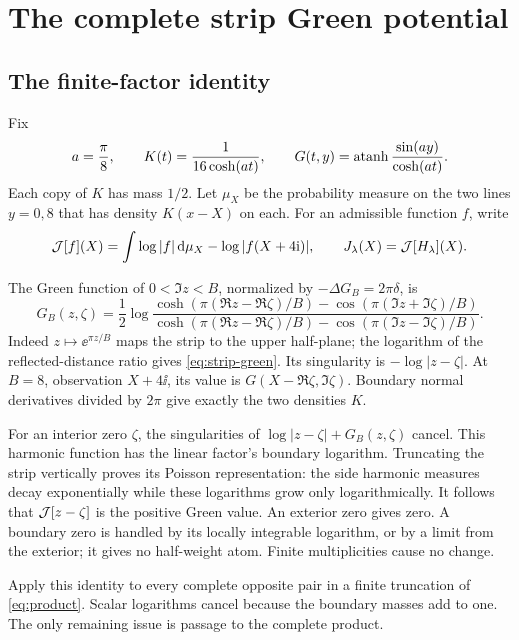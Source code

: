 \section{The complete strip Green potential}\label{sec:green}

\subsection{The finite-factor identity}

Fix
\begin{equation}\label{eq:kernels}
 a=\frac\pi8,\qquad K(t)=\frac1{16\cosh(at)},\qquad
 G(t,y)=\operatorname{atanh}\frac{\sin(ay)}{\cosh(at)}.
\end{equation}
Each copy of \(K\) has mass \(1/2\). Let \(\mu_X\) be the probability
measure on the two lines \(y=0,8\) that has density \(K(x-X)\) on
each. For an admissible function \(f\), write
\[
 \mathcal J[f](X)=\int\log|f|\,\mathrm d\mu_X-\log|f(X+4\mathrm i)|,
 \qquad J_\lambda(X)=\mathcal J[H_\lambda](X).
\]

The Green function of \(0<\Im z<B\), normalized by
\(-\Delta G_B=2\pi\delta\), is
\begin{equation}\label{eq:strip-green}
 G_B(z,\zeta)=\frac12\log
 \frac{\cosh(\pi(\Re z-\Re\zeta)/B)-\cos(\pi(\Im z+\Im\zeta)/B)}
      {\cosh(\pi(\Re z-\Re\zeta)/B)-\cos(\pi(\Im z-\Im\zeta)/B)}.
\end{equation}
Indeed \(z\mapsto\ee^{\pi z/B}\) maps the strip to the upper
half-plane; the logarithm of the reflected-distance ratio gives
\eqref{eq:strip-green}. Its singularity is \(-\log|z-\zeta|\).
At \(B=8\), observation \(X+4\ii\), its value is
\(G(X-\Re\zeta,\Im\zeta)\). Boundary normal derivatives divided
by \(2\pi\) give exactly the two densities \(K\).

For an interior zero \(\zeta\), the singularities of
\(\log|z-\zeta|+G_B(z,\zeta)\) cancel. This harmonic function has the
linear factor's boundary logarithm. Truncating the strip vertically
proves its Poisson representation: the side harmonic measures decay
exponentially while these logarithms grow only logarithmically.
It follows that \(\mathcal J[z-\zeta]\) is the positive Green value.
An exterior zero gives zero. A boundary zero is handled by its
locally integrable logarithm, or by a limit from the exterior; it
gives no half-weight atom. Finite multiplicities cause no change.

Apply this identity to every complete opposite pair in a finite
truncation of \eqref{eq:product}. Scalar logarithms cancel because
the boundary masses add to one. The only remaining issue is passage
to the complete product.

